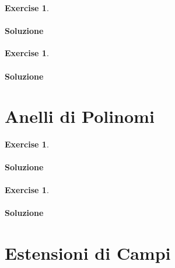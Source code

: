 \documentclass{article}
\theoremstyle{plain}
\theoremstyle{definition}
\newtheorem{xca}[exmp]{Exercise}
\theoremstyle{remark}
\begin{document}
\vspace{10pt}

\begin{bxthm}
\begin{xca}

\end{xca}
\end{bxthm}
\paragraph{Soluzione}

\vspace{10pt}

\begin{bxthm}
\begin{xca}

\end{xca}
\end{bxthm}
\paragraph{Soluzione}

\newpage
\section{Anelli di Polinomi}
\vspace{20pt}

\vspace{10pt}

\begin{bxthm}
\begin{xca}

\end{xca}
\end{bxthm}
\paragraph{Soluzione}

\vspace{10pt}

\begin{bxthm}
\begin{xca}

\end{xca}
\end{bxthm}
\paragraph{Soluzione}

\newpage
\section{Estensioni di Campi}
\end{document}
